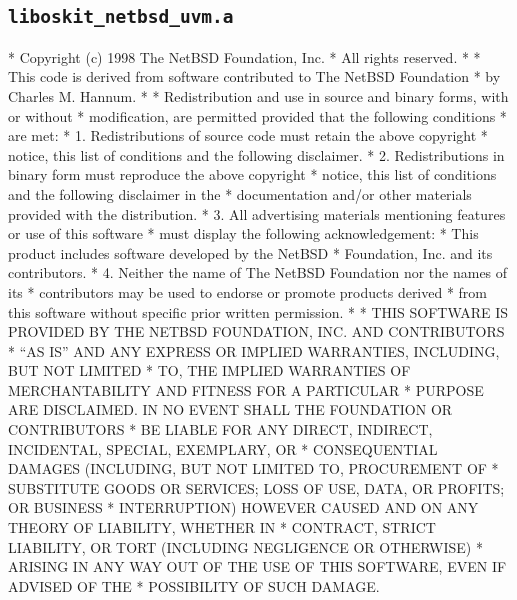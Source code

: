 \subsection{\texttt{liboskit_netbsd_uvm.a}}
\begin{copyrightEnv}
 * Copyright (c) 1998 The NetBSD Foundation, Inc.
 * All rights reserved.
 *
 * This code is derived from software contributed to The NetBSD Foundation
 * by Charles M. Hannum.
 *
 * Redistribution and use in source and binary forms, with or without
 * modification, are permitted provided that the following conditions
 * are met:
 * 1. Redistributions of source code must retain the above copyright
 *    notice, this list of conditions and the following disclaimer.
 * 2. Redistributions in binary form must reproduce the above copyright
 *    notice, this list of conditions and the following disclaimer in the
 *    documentation and/or other materials provided with the distribution.
 * 3. All advertising materials mentioning features or use of this software
 *    must display the following acknowledgement:
 *        This product includes software developed by the NetBSD
 *        Foundation, Inc. and its contributors.
 * 4. Neither the name of The NetBSD Foundation nor the names of its
 *    contributors may be used to endorse or promote products derived
 *    from this software without specific prior written permission.
 *
 * THIS SOFTWARE IS PROVIDED BY THE NETBSD FOUNDATION, INC. AND CONTRIBUTORS
 * ``AS IS'' AND ANY EXPRESS OR IMPLIED WARRANTIES, INCLUDING, BUT NOT LIMITED
 * TO, THE IMPLIED WARRANTIES OF MERCHANTABILITY AND FITNESS FOR A PARTICULAR
 * PURPOSE ARE DISCLAIMED.  IN NO EVENT SHALL THE FOUNDATION OR CONTRIBUTORS
 * BE LIABLE FOR ANY DIRECT, INDIRECT, INCIDENTAL, SPECIAL, EXEMPLARY, OR
 * CONSEQUENTIAL DAMAGES (INCLUDING, BUT NOT LIMITED TO, PROCUREMENT OF
 * SUBSTITUTE GOODS OR SERVICES; LOSS OF USE, DATA, OR PROFITS; OR BUSINESS
 * INTERRUPTION) HOWEVER CAUSED AND ON ANY THEORY OF LIABILITY, WHETHER IN
 * CONTRACT, STRICT LIABILITY, OR TORT (INCLUDING NEGLIGENCE OR OTHERWISE)
 * ARISING IN ANY WAY OUT OF THE USE OF THIS SOFTWARE, EVEN IF ADVISED OF THE
 * POSSIBILITY OF SUCH DAMAGE.
\end{copyrightEnv}


